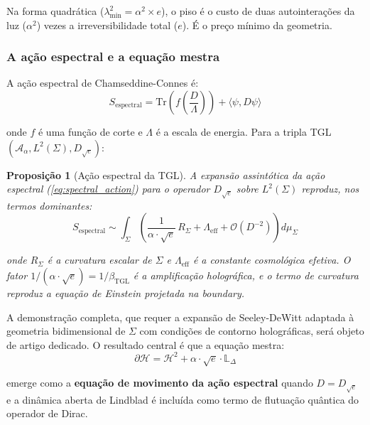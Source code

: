 \documentclass[12pt,a4paper,twoside]{article}
\newtheorem{proposition}[theorem]{Proposição}
\newcommand{\betatgl}{\beta_{\!\scriptscriptstyle\mathrm{TGL}}}
\newcommand{\boundary}{\textit{boundary}}
\begin{document}
Na forma quadrática ($\lambda_{\min}^2 = \alpha^2 \times e$), o piso é o custo de duas autointerações da luz ($\alpha^2$) vezes a irreversibilidade total ($e$). É o preço mínimo da geometria.

\subsubsection{A ação espectral e a equação mestra}

A ação espectral de Chamseddine-Connes \cite{Chamseddine1997} é:
\begin{equation}
S_{\text{espectral}} = \text{Tr}\!\left(f\!\left(\frac{D}{\Lambda}\right)\right) + \langle \psi, D\psi \rangle
\label{eq:spectral_action}
\end{equation}

\noindent onde $f$ é uma função de corte e $\Lambda$ é a escala de energia. Para a tripla TGL $(\mathcal{A}_\alpha, L^2(\Sigma), D_{\sqrt{e}})$:

\begin{proposition}[Ação espectral da TGL]
\label{prop:acao_espectral}
A expansão assintótica da ação espectral (\ref{eq:spectral_action}) para o operador $D_{\sqrt{e}}$ sobre $L^2(\Sigma)$ reproduz, nos termos dominantes:
\begin{equation}
S_{\text{espectral}} \sim \int_\Sigma \left(\frac{1}{\alpha \cdot \sqrt{e}}\, R_\Sigma + \Lambda_{\text{eff}} + \mathcal{O}(D^{-2})\right) d\mu_\Sigma
\end{equation}

\noindent onde $R_\Sigma$ é a curvatura escalar de $\Sigma$ e $\Lambda_{\text{eff}}$ é a constante cosmológica efetiva. O fator $1/(\alpha \cdot \sqrt{e}) = 1/\betatgl$ é a amplificação holográfica, e o termo de curvatura reproduz a equação de Einstein projetada na \boundary{}.
\end{proposition}

A demonstração completa, que requer a expansão de Seeley-DeWitt adaptada à geometria bidimensional de $\Sigma$ com condições de contorno holográficas, será objeto de artigo dedicado. O resultado central é que a equação mestra:
\begin{equation}
\partial\mathcal{H} = \mathcal{H}^2 + \alpha \cdot \sqrt{e} \cdot \mathbb{L}_\Delta
\end{equation}

\noindent emerge como a \textbf{equação de movimento da ação espectral} quando $D = D_{\sqrt{e}}$ e a dinâmica aberta de Lindblad é incluída como termo de flutuação quântica do operador de Dirac.
\end{document}
